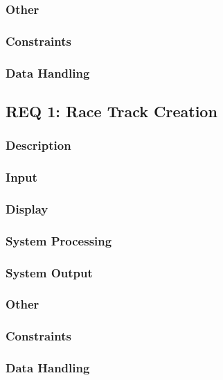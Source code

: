\documentclass[a4paper, 11pt]{article} %
\begin{document}
\subsubsection{Other}

\subsubsection{Constraints}

\subsubsection{Data Handling}

\newpage

\subsection{REQ 1: Race Track Creation}

\subsubsection{Description}

\subsubsection{Input}

\subsubsection{Display}

\subsubsection{System Processing}

\subsubsection{System Output}

\subsubsection{Other}

\subsubsection{Constraints}

\subsubsection{Data Handling}
\end{document}
